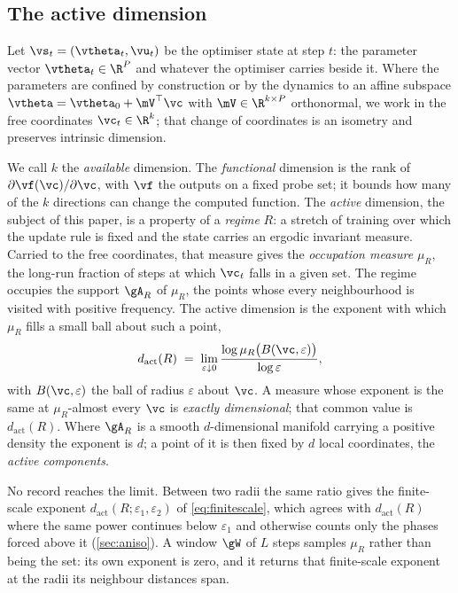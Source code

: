 \documentclass{article}
\newenvironment{claude}{\color{claudecolor}}{}
\begin{document}
\begin{claude}
\subsection{The active dimension}\label{sec:three}
\end{claude}

Let $\vs_t = (\vtheta_t, \vu_t)$ be the optimiser state at step $t$: the parameter vector
$\vtheta_t \in \R^P$ and whatever the optimiser carries beside it. Where the parameters are
confined by construction
or by the dynamics to an affine subspace $\vtheta = \vtheta_0 + \mV^{\top}\vc$ with
$\mV \in \R^{k \times P}$ orthonormal, we work in the free coordinates $\vc_t \in \R^k$; that
change of coordinates is an isometry and preserves intrinsic dimension.

We call $k$ the \emph{available} dimension. The \emph{functional} dimension is the rank of
$\partial \vf(\vc)/\partial \vc$, with $\vf$ the outputs on a fixed probe set; it bounds how many of
the $k$ directions can change the computed function. The \emph{active} dimension, the subject of
this paper, is a property of a \emph{regime} $R$: a stretch of training over which the update rule
is fixed and the state carries an ergodic invariant measure. Carried to the free coordinates, that
measure gives the \emph{occupation measure} $\mu_R$, the long-run fraction of steps at which $\vc_t$
falls in a given set. The regime occupies the support $\gA_R$ of $\mu_R$, the points whose every
neighbourhood is visited with positive frequency. The active dimension is the exponent with which
$\mu_R$ fills a small ball about such a point,
\begin{equation}\label{eq:act}
  d_{\mathrm{act}}(R) \;=\; \lim_{\varepsilon \downarrow 0}
  \frac{\log \mu_R\bigl(B(\vc, \varepsilon)\bigr)}{\log \varepsilon} ,
\end{equation}
with $B(\vc, \varepsilon)$ the ball of radius $\varepsilon$ about $\vc$. A measure whose exponent
is the same at $\mu_R$-almost every $\vc$ is \emph{exactly dimensional}; that common value is
$d_{\mathrm{act}}(R)$. Where $\gA_R$ is a smooth $d$-dimensional manifold carrying a positive
density the exponent is $d$; a point of it is then fixed by $d$ local coordinates, the \emph{active
components}.

No record reaches the limit. Between two radii the same ratio gives the finite-scale exponent
$d_{\mathrm{act}}(R; \varepsilon_1, \varepsilon_2)$ of \cref{eq:finitescale}, which agrees with
$d_{\mathrm{act}}(R)$ where the same power continues below $\varepsilon_1$ and otherwise counts only
the phases forced above it (\cref{sec:aniso}). A window $\gW$ of $L$ steps samples $\mu_R$ rather
than being the set: its own exponent is zero, and it returns that finite-scale exponent at the
radii its neighbour distances span.
\end{document}
